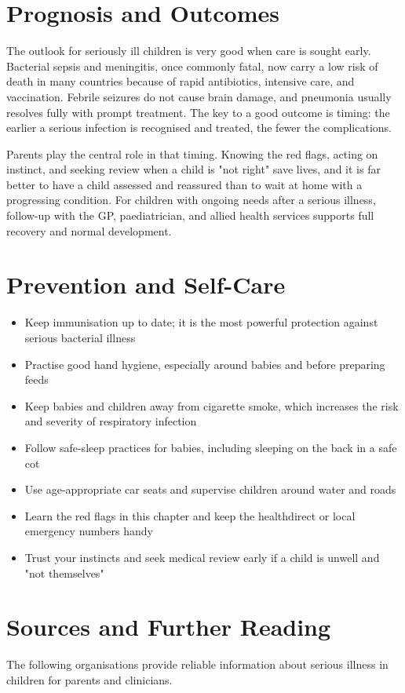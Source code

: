 \section*{Prognosis and Outcomes}
The outlook for seriously ill children is very good when care is sought early. Bacterial sepsis and meningitis, once commonly fatal, now carry a low risk of death in many countries because of rapid antibiotics, intensive care, and vaccination. Febrile seizures do not cause brain damage, and pneumonia usually resolves fully with prompt treatment. The key to a good outcome is timing: the earlier a serious infection is recognised and treated, the fewer the complications.

Parents play the central role in that timing. Knowing the red flags, acting on instinct, and seeking review when a child is "not right" save lives, and it is far better to have a child assessed and reassured than to wait at home with a progressing condition. For children with ongoing needs after a serious illness, follow-up with the GP, paediatrician, and allied health services supports full recovery and normal development.

\section*{Prevention and Self-Care}
\begin{itemize}
    \item Keep immunisation up to date; it is the most powerful protection against serious bacterial illness
    \item Practise good hand hygiene, especially around babies and before preparing feeds
    \item Keep babies and children away from cigarette smoke, which increases the risk and severity of respiratory infection
    \item Follow safe-sleep practices for babies, including sleeping on the back in a safe cot
    \item Use age-appropriate car seats and supervise children around water and roads
    \item Learn the red flags in this chapter and keep the healthdirect or local emergency numbers handy
    \item Trust your instincts and seek medical review early if a child is unwell and "not themselves"
\end{itemize}

\section*{Sources and Further Reading}
The following organisations provide reliable information about serious illness in children for parents and clinicians.

